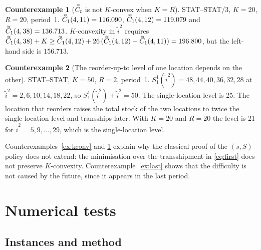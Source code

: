 \documentclass[11pt]{article}
\DeclareRobustCommand{\dbtilde}[1]{\accentset{\approx}{#1}}
\newcommand{\Cq}{\dbtilde{C}}
\theoremstyle{definition}
\newtheorem{example}{Counterexample}
\begin{document}
\begin{example}[$\Cq_t$ is not $K$-convex when $K=R$]\label{ex:kconv2}
STAT--STAT/3, $K=20$, $R=20$, period~1. $\Cq_1(4,11)=116.090$, $\Cq_1(4,12)=119.079$ and $\Cq_1(4,38)=136.713$. $K$-convexity in $\tilde{i}^2$ requires $\Cq_1(4,38)+K\ge\Cq_1(4,12)+26\,(\Cq_1(4,12)-\Cq_1(4,11))=196.800$, but the left-hand side is $156.713$.
\end{example}

\begin{example}[The reorder-up-to level of one location depends on the other]\label{ex:slope}
STAT--STAT, $K=50$, $R=2$, period~1. $S^1_1(\tilde{i}^2)=48,44,40,36,32,28$ at $\tilde{i}^2=2,6,10,14,18,22$, so $S^1_1(\tilde{i}^2)+\tilde{i}^2=50$. The single-location level is 25. The location that reorders raises the total stock of the two locations to twice the single-location level and transships later. With $K=20$ and $R=20$ the level is 21 for $\tilde{i}^2=5,9,\ldots,29$, which is the single-location level.
\end{example}

Counterexamples~\ref{ex:kconv} and \ref{ex:kconv2} explain why the classical proof of the $(s,S)$ policy does not extend: the minimisation over the transshipment in \eqref{eq:first} does not preserve $K$-convexity. Counterexample~\ref{ex:last} shows that the difficulty is not caused by the future, since it appears in the last period.

\section{Numerical tests}\label{sec:numerics}

\subsection{Instances and method}
\end{document}
